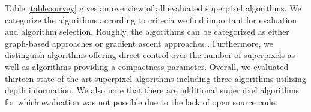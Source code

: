 \documentclass[runningheads]{llncs}
\begin{document}
    Table \ref{table:survey} gives an overview of all evaluated superpixel algorithms. We categorize the algorithms according to criteria we find important for evaluation and algorithm selection. Roughly, the algorithms can be categorized as either graph-based approaches or gradient ascent approaches \cite{AchantaShajiSmithLucchiFuaSuesstrunk:2012}. Furthermore, we distinguish algorithms offering direct control over the number of superpixels as well as algorithms providing a compactness parameter. Overall, we evaluated thirteen state-of-the-art superpixel algorithms including three algorithms utilizing depth information.
    We also note that there are additional superpixel algorithms \cite{RohkohlEngel:2007,MoorePrinceWarrellMohammedJones:2008,DruckerMacCormick:2009,ZengWangWangGanZha:2011,PerbetStengerMaki:2012,SivaWong:2014} for which evaluation was not possible due to the lack of open source code.
    
\end{document}
